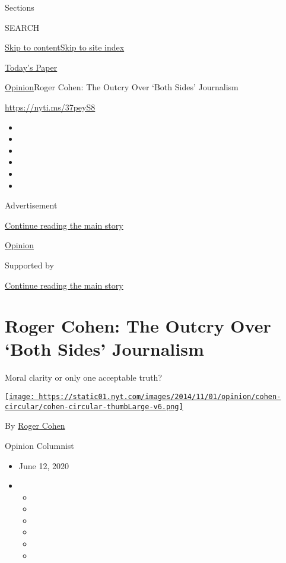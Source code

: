 Sections

SEARCH

\protect\hyperlink{site-content}{Skip to
content}\protect\hyperlink{site-index}{Skip to site index}

\href{https://myaccount.nytimes.com/auth/login?response_type=cookie\&client_id=vi}{}

\href{https://www.nytimes.com/section/todayspaper}{Today's Paper}

\href{/section/opinion}{Opinion}\textbar{}Roger Cohen: The Outcry Over
`Both Sides' Journalism

\href{https://nyti.ms/37peyS8}{https://nyti.ms/37peyS8}

\begin{itemize}
\item
\item
\item
\item
\item
\item
\end{itemize}

Advertisement

\protect\hyperlink{after-top}{Continue reading the main story}

\href{/section/opinion}{Opinion}

Supported by

\protect\hyperlink{after-sponsor}{Continue reading the main story}

\hypertarget{roger-cohen-the-outcry-over-both-sides-journalism}{%
\section{Roger Cohen: The Outcry Over `Both Sides'
Journalism}\label{roger-cohen-the-outcry-over-both-sides-journalism}}

Moral clarity or only one acceptable truth?

\href{https://www.nytimes.com/by/roger-cohen}{\texttt{[image: https://static01.nyt.com/images/2014/11/01/opinion/cohen-circular/cohen-circular-thumbLarge-v6.png]}}

By \href{https://www.nytimes.com/by/roger-cohen}{Roger Cohen}

Opinion Columnist

\begin{itemize}
\item
  June 12, 2020
\item
  \begin{itemize}
  \item
  \item
  \item
  \item
  \item
  \item
  \end{itemize}
\end{itemize}

